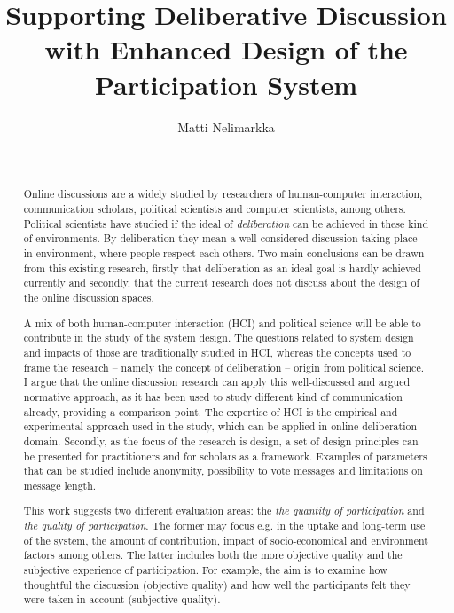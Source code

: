 \documentclass{article}
\date{~}
\author{\textsf{Matti Nelimarkka}}
\title{\textsf{Supporting Deliberative Discussion with Enhanced Design of the Participation System}}
\begin{document}
\maketitle

\begin{abstract}

Online discussions are a widely studied by researchers of human-computer interaction, communication scholars, political scientists and computer scientists, among others. Political scientists have studied if the ideal of \textit{deliberation} can be achieved in these kind of environments. By deliberation they mean a well-considered discussion taking place in environment, where people respect each others. Two main conclusions can be drawn from this existing research, firstly that deliberation as an ideal goal is hardly achieved currently and secondly, that the current research does not discuss about the design of the online discussion spaces.

A mix of both human-computer interaction (HCI) and political science will be able to contribute in the study of the system design. The questions related to system design and impacts of those are traditionally studied in HCI, whereas the concepts used to frame the research -- namely the concept of deliberation -- origin from political science. I argue that the online discussion research can apply this well-discussed and argued normative approach, as it has been used to study different kind of communication already, providing a comparison point. The expertise of HCI is the empirical and experimental approach used in the study, which can be applied in online deliberation domain. Secondly, as the focus of the research is design, a set of design principles can be presented for practitioners and for scholars as a framework. Examples of parameters that can be studied include anonymity, possibility to vote messages and limitations on message length.

This work suggests two different evaluation areas: the \textit{the quantity of participation} and \textit{the quality of participation}. The former may focus e.g. in the uptake and long-term use of the system, the amount of contribution, impact of socio-economical and environment factors among others. The latter includes both the more objective quality and the subjective experience of participation. For example, the aim is to examine how thoughtful the discussion (objective quality) and how well the participants felt they were taken in account (subjective quality).
\end{abstract}
\end{document}
